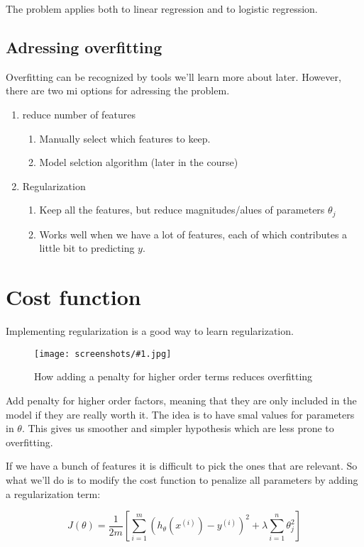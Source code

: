 \documentclass[a4, 12pt, english, USenglish]{scrreprt}
\newcommand{\screenshot}[2]{
\begin{figure}[htb]
\texttt{[image: screenshots/\#1.jpg]}
\label{#1}
\caption{#2}
\end{figure}}
\newcommand{\brackets}[1]{\ensuremath{\left[{#1}\right]}}
\newcommand{\parens}[1]{\ensuremath{\left({#1}\right)}}
\begin{document}
The problem applies both to linear regression and to logistic
regression.

\subsection{Adressing overfitting}

Overfitting can be recognized by tools we'll learn more about later.
However, there are two mi options for adressing the problem.

\begin{enumerate}
\item reduce number of features
\begin{enumerate}
\item Manually select which features to keep.
\item Model selction algorithm (later in the course)
\end{enumerate}

\item Regularization
\begin{enumerate}
\item Keep all the features, but reduce magnitudes/alues of parameters \(\theta_j\)
\item Works well when we have a lot of features, each of which
  contributes a little  bit to predicting \(y\).
\end{enumerate}

\end{enumerate}

\section{Cost function}

Implementing regularization is a good way to learn regularization.

\screenshot{penlaltyforcost}{How adding a penalty for higher order
  terms reduces overfitting}

Add penalty for higher order factors, meaning that they are only
included in the model if they are really worth it.  The idea is to
have smal values for parameters in \(\theta\).   This gives us
smoother and simpler
hypothesis which are less prone to overfitting.

If we have a bunch of features it is difficult to pick the ones that
are relevant.   So what we'll do is to modify the cost function to
penalize all parameters by adding a regularization term:


\[
 J(\theta) = \frac{1}{2m} \brackets{\sum_{i=1}^m \parens{h_\theta(x^{(i)}) -
   y^{(i)}}^2  + \lambda \sum_{i=1}^n \theta_j^2}
\]
\end{document}
